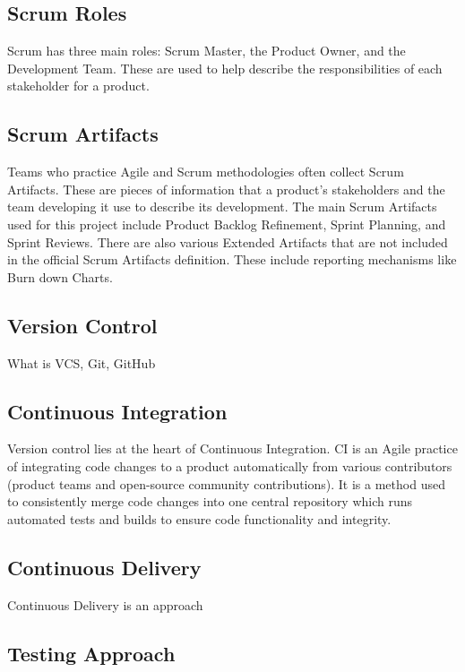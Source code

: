 \documentclass{article}
\begin{document}
\subsection{Scrum Roles}
Scrum has three main roles: Scrum Master, the Product Owner, and the Development Team. These are used to help describe the responsibilities of each stakeholder for a product.



\subsection{Scrum Artifacts}
Teams who practice Agile and Scrum methodologies often collect Scrum Artifacts. These are pieces of information that a product's stakeholders and the team developing it use to describe its development. The main Scrum Artifacts used for this project include Product Backlog Refinement, Sprint Planning, and Sprint Reviews. There are also various Extended Artifacts that are not included in the official Scrum Artifacts definition. These include reporting mechanisms like Burn down Charts.



\subsection{Version Control}
What is VCS, Git, GitHub 



\subsection{Continuous Integration}
Version control lies at the heart of Continuous Integration. CI is an Agile practice of integrating code changes to a product automatically from various contributors (product teams and open-source community contributions). It is a method used to consistently merge code changes into one central repository which runs automated tests and builds to ensure code functionality and integrity.   



\subsection{Continuous Delivery}
Continuous Delivery is an approach 



\subsection{Testing Approach}
\end{document}
